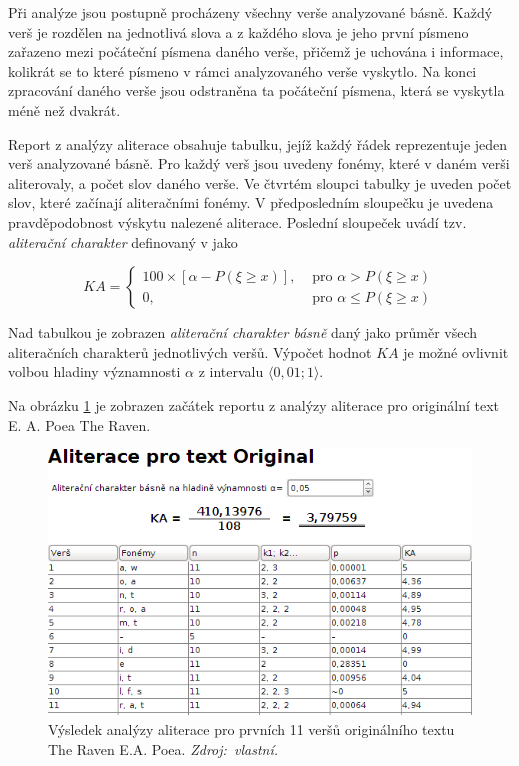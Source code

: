 \documentclass[dp.tex]{subfiles}
\begin{document}
Při analýze jsou postupně procházeny všechny verše analyzované básně. Každý verš je rozdělen na jednotlivá slova a z každého slova je jeho první písmeno zařazeno mezi počáteční písmena daného verše, přičemž je uchována i informace, kolikrát se to které písmeno v rámci analyzovaného verše vyskytlo. Na konci zpracování daného verše jsou odstraněna ta počáteční písmena, která se vyskytla méně než dvakrát.

Report z analýzy aliterace obsahuje tabulku, jejíž každý řádek reprezentuje jeden verš analyzované básně. Pro každý verš jsou uvedeny fonémy, které v daném verši aliterovaly, a počet slov daného verše. Ve čtvrtém sloupci tabulky je uveden počet slov, které začínají aliteračními fonémy. V předposledním sloupečku je uvedena pravděpodobnost výskytu nalezené aliterace. Poslední sloupeček uvádí tzv. \textit{aliterační charakter} definovaný v \cite[str.~60]{Wimmer2003} jako

\[KA = \left\{
  \begin{array}{lr}
    100 \times [ \alpha - P( \xi \geq x)],& \text{ pro } \alpha >  P( \xi \geq x)\\
    0,& \text{ pro } \alpha \leq  P( \xi \geq x)
  \end{array}
\right.
\]

Nad tabulkou je zobrazen \textit{aliterační charakter básně} daný jako průměr všech aliteračních charakterů jednotlivých veršů. Výpočet hodnot $KA$ je možné ovlivnit volbou hladiny významnosti $\alpha$ z intervalu $\langle 0{,}01; 1 \rangle$.

Na obrázku \ref{fig:alliteration} je zobrazen začátek reportu z analýzy aliterace pro originální text E. A. Poea The Raven.

\begin{figure}[H]
	\centering
	\includegraphics[max width=\textwidth,keepaspectratio=true]{imgs-70-prakticka/alliteration}
	\caption[Výsledek analýzy aliterace pro prvních 11 veršů originálního textu The Raven E.A. Poea]{Výsledek analýzy aliterace pro prvních 11 veršů originálního textu The Raven E.A. Poea. \textit{Zdroj:~vlastní.}}
	\label{fig:alliteration}
\end{figure}
\end{document}
